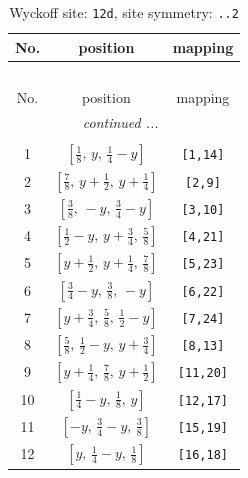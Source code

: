 \documentclass[fleqn,8pt]{jsarticle}
\begin{document}
\begin{longtable}{ccc}
\caption{Wyckoff site: {\tt 12d}, site symmetry: {\tt ..2}}
 \\
 \hline \hline
No. & position & mapping \\ \hline \endfirsthead

\multicolumn{2}{l}{\tablename\ \thetable{}} \\
 \hline \hline
No. & position & mapping \\ \hline \endhead

 \hline \hline
\multicolumn{2}{r}{\footnotesize\it continued ...} \\ \endfoot

 \hline \hline
\multicolumn{2}{r}{} \\ \endlastfoot

1 & $\left[ \frac{1}{8},\, y,\, \frac{1}{4} - y \right]$ & {\tt [1,14]} \\ \hline
2 & $\left[ \frac{7}{8},\, y + \frac{1}{2},\, y + \frac{1}{4} \right]$ & {\tt [2,9]} \\ \hline
3 & $\left[ \frac{3}{8},\, - y,\, \frac{3}{4} - y \right]$ & {\tt [3,10]} \\ \hline
4 & $\left[ \frac{1}{2} - y,\, y + \frac{3}{4},\, \frac{5}{8} \right]$ & {\tt [4,21]} \\ \hline
5 & $\left[ y + \frac{1}{2},\, y + \frac{1}{4},\, \frac{7}{8} \right]$ & {\tt [5,23]} \\ \hline
6 & $\left[ \frac{3}{4} - y,\, \frac{3}{8},\, - y \right]$ & {\tt [6,22]} \\ \hline
7 & $\left[ y + \frac{3}{4},\, \frac{5}{8},\, \frac{1}{2} - y \right]$ & {\tt [7,24]} \\ \hline
8 & $\left[ \frac{5}{8},\, \frac{1}{2} - y,\, y + \frac{3}{4} \right]$ & {\tt [8,13]} \\ \hline
9 & $\left[ y + \frac{1}{4},\, \frac{7}{8},\, y + \frac{1}{2} \right]$ & {\tt [11,20]} \\ \hline
10 & $\left[ \frac{1}{4} - y,\, \frac{1}{8},\, y \right]$ & {\tt [12,17]} \\ \hline
11 & $\left[ - y,\, \frac{3}{4} - y,\, \frac{3}{8} \right]$ & {\tt [15,19]} \\ \hline
12 & $\left[ y,\, \frac{1}{4} - y,\, \frac{1}{8} \right]$ & {\tt [16,18]} \\
\end{longtable}
\renewcommand{\arraystretch}{1.2}
\end{document}
